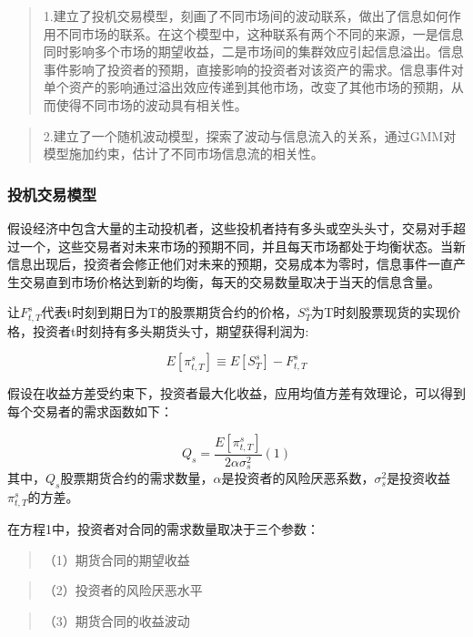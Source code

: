 \documentclass[
]{article}
\begin{document}
\begin{quote}
1.建立了投机交易模型，刻画了不同市场间的波动联系，做出了信息如何作用不同市场的联系。在这个模型中，这种联系有两个不同的来源，一是信息同时影响多个市场的期望收益，二是市场间的集群效应引起信息溢出。信息事件影响了投资者的预期，直接影响的投资者对该资产的需求。信息事件对单个资产的影响通过溢出效应传递到其他市场，改变了其他市场的预期，从而使得不同市场的波动具有相关性。
\end{quote}

\begin{quote}
2.建立了一个随机波动模型，探索了波动与信息流入的关系，通过GMM对模型施加约束，估计了不同市场信息流的相关性。
\end{quote}

\hypertarget{ux6295ux673aux4ea4ux6613ux6a21ux578b}{%
\subsubsection{投机交易模型}\label{ux6295ux673aux4ea4ux6613ux6a21ux578b}}

假设经济中包含大量的主动投机者，这些投机者持有多头或空头头寸，交易对手超过一个，这些交易者对未来市场的预期不同，并且每天市场都处于均衡状态。当新信息出现后，投资者会修正他们对未来的预期，交易成本为零时，信息事件一直产生交易直到市场价格达到新的均衡，每天的交易数量取决于当天的信息含量。

让\(F_{t,T}^s\)代表t时刻到期日为T的股票期货合约的价格，\(S_{T}^s\)为T时刻股票现货的实现价格，投资者t时刻持有多头期货头寸，期望获得利润为:

\[E[\pi_{t,T}^s] \equiv E[S_T^s]-F_{t,T}^s\]

假设在收益方差受约束下，投资者最大化收益，应用均值方差有效理论，可以得到每个交易者的需求函数如下：

\[ Q_s=\frac{E[\pi_{t,T}^s]}{2\alpha \sigma_s^2} (1)\]
其中，\(Q_s\)股票期货合约的需求数量，\(\alpha\)是投资者的风险厌恶系数，\(\sigma_s^2\)是投资收益\(\pi_{t,T}^s\)的方差。

在方程1中，投资者对合同的需求数量取决于三个参数：

\begin{quote}
（1）期货合同的期望收益
\end{quote}

\begin{quote}
（2）投资者的风险厌恶水平
\end{quote}

\begin{quote}
（3）期货合同的收益波动
\end{quote}
\end{document}
